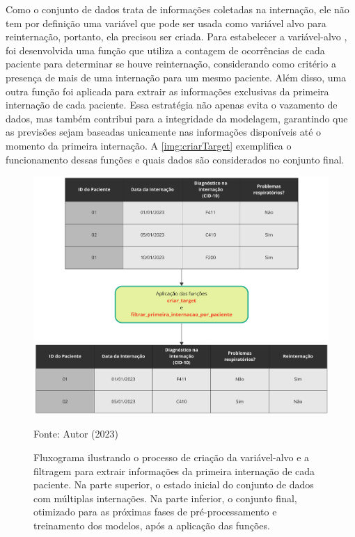 Como o conjunto de dados trata de informações coletadas na internação, ele não tem por definição uma variável que pode ser usada como variável alvo para reinternação, portanto, ela precisou ser criada. Para estabelecer a variável-alvo , foi desenvolvida uma função que utiliza a contagem de ocorrências de cada paciente para determinar se houve reinternação, considerando como critério a presença de mais de uma internação para um mesmo paciente. Além disso, uma outra função foi aplicada para extrair as informações exclusivas da primeira internação de cada paciente. Essa estratégia não apenas evita o vazamento de dados, mas também contribui para a integridade da modelagem, garantindo que as previsões sejam baseadas unicamente nas informações disponíveis até o momento da primeira internação. A \autoref{img:criarTarget} exemplifica o funcionamento dessas funções e quais dados são considerados no conjunto final.

\begin{figure}[H]
	\centering
	\caption{\label{img:criarTarget}Fluxograma ilustrando o processo de criação da variável-alvo  e a filtragem para extrair informações da primeira internação de cada paciente. Na parte superior, o estado inicial do conjunto de dados com múltiplas internações. Na parte inferior, o conjunto final, otimizado para as próximas fases de pré-processamento e treinamento dos modelos, após a aplicação das funções.}
	\includegraphics[scale=0.7]{USPSC-img/criacao_target.pdf}
	\begin{center}
		Fonte: Autor (2023)
	\end{center}
\end{figure}

